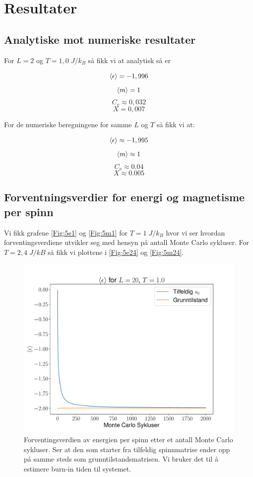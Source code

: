 \documentclass[reprint,english,notitlepage]{revtex4-2}  %
\begin{document}
\section{Resultater}

\subsection{Analytiske mot numeriske resultater}

For $L = 2$ og $T = 1,0 \; J/k_B$ så fikk vi at analytisk så er

$$ \expval{\epsilon} = -1,996 $$
$$ \expval{m} =  1 $$
$$ C_v  \approx 0,032 $$
$$ X = 0,007$$

For de numeriske beregningene for samme $L$ og $T$ så fikk vi at:

$$ \expval{\epsilon} \approx -1,995 $$
$$ \expval{m} \approx 1$$
$$ C_v \approx 0.04$$
$$ X \approx 0.005$$


\subsection{Forventningsverdier for energi og magnetisme per spinn}

Vi fikk grafene \autoref{Fig:5e1} og \autoref{Fig:5m1} for $T =  1 \; J/k_B $ hvor vi ser hvordan forventingsverdiene utvikler seg med hensyn på antall Monte Carlo sykluser. For $T = 2,4 \; J/kB$ så fikk vi plottene i \autoref{Fig:5e24} og \autoref{Fig:5m24}.

\begin{figure}[H]
\centering
\includegraphics[scale=0.4, trim=1.3cm 0 0 0 ]{../Images/meanepsT1L20.pdf}
\caption{Forventingsverdien av energien per spinn etter et antall Monte Carlo sykluser. Ser at den som starter fra tilfeldig spinnmatrise ender opp på samme steds som grunntilstandsmatrisen. Vi bruker det til å estimere burn-in tiden til systemet.}
\label{Fig:5e1}
\end{figure}
\end{document}
